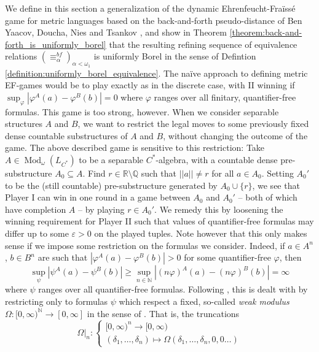 \documentclass[12pt]{amsart}
\DeclareMathOperator{\Mod}{Mod}
\begin{document}
We define in this section a generalization of the dynamic Ehrenfeucht-Fra\"iss\'e game for metric languages based on the back-and-forth pseudo-distance of Ben Yaacov, Doucha, Nies and Tsankov \cite{yaacov2017metric}, and show in Theorem \ref{theorem:back-and-forth_is_uniformly_borel} that the resulting refining sequence of equivalence relations $(\equiv^{bf}_\alpha)_{\alpha<\omega_1}$ is uniformly Borel in the sense of Defintion \ref{definition:uniformly_borel_equivalence}. 
The na\"ive approach to defining metric EF-games would be to play exactly as in the discrete case, with II winning if $\sup_\varphi|\varphi^A(a)-\varphi^B(b)|=0$ where $\varphi$ ranges over all finitary, quantifier-free formulas. This game is too strong, however. When we consider separable structures $A$ and $B$, we want to restrict the legal moves to some previously fixed dense countable substructures of $A$ and $B$, without changing the outcome of the game. The above described game is sensitive to this restriction: Take $A\in\Mod_\omega(L_{C^*})$ to be a separable $C^*$-algebra, with a countable dense pre-substructure $A_0 \subseteq A$. Find $r\in\mathbb R\setminus\mathbb Q$ such that $||a||\neq r$ for all $a\in A_0$. Setting $A_0'$ to be the (still countable) pre-substructure generated by $A_0\cup\{r\}$, we see that Player I can win in one round in a game between $A_0$ and $A_0'$ -- both of which have completion $A$ -- by playing $r\in A_0'$. We remedy this by loosening the winning requirement for Player II such that values of quantifier-free formulas may differ up to some $\varepsilon>0$ on the played tuples. Note however that this only makes sense if we impose some restriction on the formulas we consider. Indeed, if $a\in A^n$, $b\in B^n$ are such that $|\varphi^A(a)-\varphi^B(b)|>0$ for some quantifier-free $\varphi$, then 
\[\sup_\psi|\psi^A(a)-\psi^B(b)|\geq \sup_{n\in\mathbb N}|(n\varphi)^A(a)-(n\varphi)^B(b)|=\infty\]
where $\psi$ ranges over all quantifier-free formulas.
Following \cite{yaacov2017metric}, this is dealt with by restricting only to formulas $\psi$ which respect a fixed, so-called \textit{weak modulus} $\Omega \colon [0,\infty)^{\mathbb N}\to[0,\infty]$ in the sense of \cite[Definition 2.2]{yaacov2017metric}. That is, the truncations
\[\Omega|_n \colon \begin{cases}
    [0,\infty)^n\to[0,\infty)\\
    (\delta_1,\dots,\delta_n)\mapsto\Omega(\delta_1,\dots,\delta_n,0,0\dots)
\end{cases}\]
\end{document}
